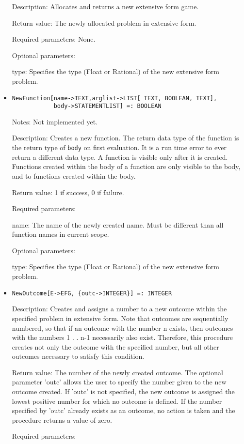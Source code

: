 \begin{itemize}
\bd
\item
[Description:] Allocates and returns a new extensive form game.
\item
[Return value:] The newly allocated problem in extensive form.
\item
[Required parameters:] None.
\item
[Optional parameters:]\hfil\null

\bd
\item
[type:] Specifies the type (Float or Rational) of the new extensive
form problem.
\ed
\ed

\item
\protect \large \begin{verbatim}
NewFunction[name->TEXT,arglist->LIST[ TEXT, BOOLEAN, TEXT], 
            body->STATEMENTLIST] =: BOOLEAN
\end{verbatim}\normalsize

\bd
\item [Notes:] Not implemented yet.  
\item
[Description:] Creates a new function.  The return data type of the
function is the return type of \verb+body+ on first evaluation.  It is
a run time error to ever return a different data type.  A function is
visible only after it is created.  Functions created within the body
of a function are only visible to the body, and to functions created
within the body.
\item
[Return value:] 1 if success, 0 if failure.  
\item
[Required parameters:]
\bd
\item[name:] The name of the newly created name.  Must be different
than all function names in current scope.  
\ed
\item
[Optional parameters:]\hfil\null

\bd
\item
[type:] Specifies the type (Float or Rational) of the new extensive
form problem.
\ed
\ed

\item
\protect \large \begin{verbatim}
NewOutcome[E->EFG, {outc->INTEGER}] =: INTEGER
\end{verbatim}\normalsize

\bd
\item
[Description:] Creates and assigns a number to a new outcome within
the specified problem in extensive form.  Note that outcomes are
sequentially numbered, so that if an outcome with the number n exists,
then outcomes with the numbers 1 . . n-1 necessarily also exist.
Therefore, this procedure creates not only the outcome with the
specified number, but all other outcomes necessary to satisfy this
condition.
\item
[Return value:] The number of the newly created outcome.  The optional
parameter 'outc' allows the user to specify the number given to the
new outcome created.  If 'outc' is not specified, the new outcome is
assigned the lowest positive number for which no outcome is defined.
If the number specified by 'outc' already exists as an outcome, no
action is taken and the procedure returns a value of zero.
\item
[Required parameters:]\hfil\null


\end{itemize}
